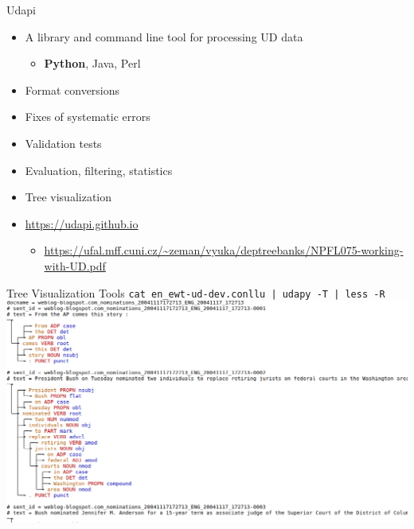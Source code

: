 \documentclass[10pt, compress, aspectratio=169]{beamer}
\newcommand{\nologo}{\setbeamertemplate{logo}{}}
\begin{document}
\begin{frame}{Udapi}
  \begin{itemize}
    \item A library and command line tool for processing UD data
      \begin{itemize}
        \item {\bf Python}, Java, Perl
      \end{itemize}
    \item Format conversions
    \item Fixes of systematic errors
    \item Validation tests
    \item Evaluation, filtering, statistics
    \item Tree visualization
    \item \url{https://udapi.github.io}
      \begin{itemize}
        \item
            \url{https://ufal.mff.cuni.cz/~zeman/vyuka/deptreebanks/NPFL075-working-with-UD.pdf}
      \end{itemize}
  \end{itemize}
\end{frame}


{\nologo\begin{frame}{Tree Visualization Tools}
  {\tt cat en\_ewt-ud-dev.conllu | udapy -T | less -R}
  \includegraphics[width=\linewidth,height=\textheight,keepaspectratio]{images/udapi_viz.png}
\end{frame}}
\end{document}
